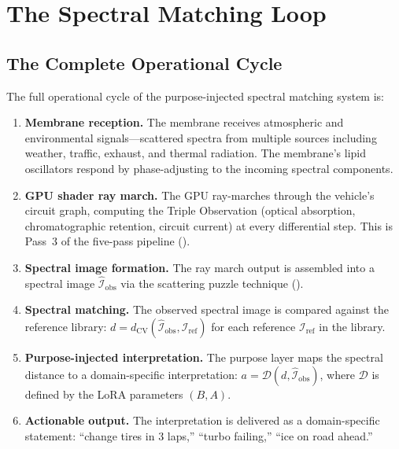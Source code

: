 \documentclass[11pt,twocolumn,a4paper]{article}
\theoremstyle{definition}
\theoremstyle{remark}
\newcommand{\dcv}{d_{\mathrm{CV}}}
\begin{document}
\section{The Spectral Matching Loop}\label{sec:matching-loop}

\subsection{The Complete Operational Cycle}

The full operational cycle of the purpose-injected spectral matching system is:

\begin{enumerate}
    \item \textbf{Membrane reception.}  The membrane receives atmospheric and environmental signals---scattered spectra from multiple sources including weather, traffic, exhaust, and thermal radiation.  The membrane's lipid oscillators respond by phase-adjusting to the incoming spectral components.

    \item \textbf{GPU shader ray march.}  The GPU ray-marches through the vehicle's circuit graph, computing the Triple Observation (optical absorption, chromatographic retention, circuit current) at every differential step.  This is Pass~3 of the five-pass pipeline ().

    \item \textbf{Spectral image formation.}  The ray march output is assembled into a spectral image $\hat{\mathcal{I}}_{\mathrm{obs}}$ via the scattering puzzle technique ().

    \item \textbf{Spectral matching.}  The observed spectral image is compared against the reference library: $d = \dcv(\hat{\mathcal{I}}_{\mathrm{obs}}, \mathcal{I}_{\mathrm{ref}})$ for each reference $\mathcal{I}_{\mathrm{ref}}$ in the library.

    \item \textbf{Purpose-injected interpretation.}  The purpose layer maps the spectral distance to a domain-specific interpretation: $a = \mathcal{D}(d, \hat{\mathcal{I}}_{\mathrm{obs}})$, where $\mathcal{D}$ is defined by the LoRA parameters $(B, A)$.

    \item \textbf{Actionable output.}  The interpretation is delivered as a domain-specific statement: ``change tires in 3 laps,'' ``turbo failing,'' ``ice on road ahead.''
\end{enumerate}
\end{document}
